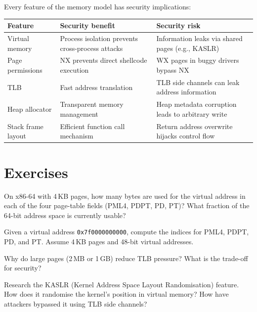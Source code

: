 Every feature of the memory model has security implications:

\begin{longtable}{p{3.5cm}p{4.5cm}p{4.5cm}}
	\toprule
	\textbf{Feature}   & \textbf{Security benefit}                        & \textbf{Security risk}                            \\
	\midrule
	Virtual memory     & Process isolation prevents cross-process attacks & Information leaks via shared pages (e.g., KASLR)  \\
	Page permissions   & NX prevents direct shellcode execution           & WX pages in buggy drivers bypass NX               \\
	TLB                & Fast address translation                         & TLB side channels can leak address information    \\
	Heap allocator     & Transparent memory management                    & Heap metadata corruption leads to arbitrary write \\
	Stack frame layout & Efficient function call mechanism                & Return address overwrite hijacks control flow     \\
	\bottomrule
\end{longtable}

\section{Exercises}

\begin{exercise}
	On x86-64 with 4\,KB pages, how many bytes are used for the virtual address in each of the four page-table fields (PML4, PDPT, PD, PT)? What fraction of the 64-bit address space is currently usable?
\end{exercise}

\begin{exercise}
	Given a virtual address \texttt{0x7f0000000000}, compute the indices for PML4, PDPT, PD, and PT. Assume 4\,KB pages and 48-bit virtual addresses.
\end{exercise}

\begin{exercise}
	Why do large pages (2\,MB or 1\,GB) reduce TLB pressure? What is the trade-off for security?
\end{exercise}

\begin{exercise}
	Research the KASLR (Kernel Address Space Layout Randomisation) feature. How does it randomise the kernel's position in virtual memory? How have attackers bypassed it using TLB side channels?
\end{exercise}
